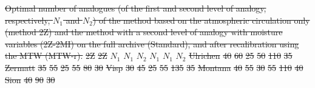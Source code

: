\documentclass[hess, manuscript]{copernicus}
\providecommand{\DIFdel}[1]{{\protect\color{red}\sout{#1}}}                      %
\providecommand{\DIFdelFL}[1]{\DIFdel{#1}} %
\begin{document}
\begin{table}[htb]
{%
\DIFdelFL{Optimal number of analogues (of the first and second level of analogy, respectively, $N_{1}$ and $N_{2}$) of the method based on the atmospheric circulation only (method 2Z) and the method with a second level of analogy with moisture variables (2Z-2MI) on the full archive (Standard), and after recalibration using the MTW (MTW-r).}}
\DIFdelFL{2Z }%
\DIFdelFL{2Z }%
\DIFdelFL{$N_{1}$ }%
\DIFdelFL{$N_{1}$ }%
\DIFdelFL{$N_{2}$ }%
\DIFdelFL{$N_{1}$ }%
\DIFdelFL{$N_{1}$ }%
\DIFdelFL{$N_{2}$}%
\DIFdelFL{Ulrichen }%
\DIFdelFL{40 }%
\DIFdelFL{60 }%
\DIFdelFL{25 }%
\DIFdelFL{50 }%
\DIFdelFL{110 }%
\DIFdelFL{35}%
\DIFdelFL{Zermatt }%
\DIFdelFL{35 }%
\DIFdelFL{55 }%
\DIFdelFL{25 }%
\DIFdelFL{55 }%
\DIFdelFL{80 }%
\DIFdelFL{30}%
\DIFdelFL{Visp }%
\DIFdelFL{30 }%
\DIFdelFL{45 }%
\DIFdelFL{25 }%
\DIFdelFL{55 }%
\DIFdelFL{135 }%
\DIFdelFL{35}%
\DIFdelFL{Montana }%
\DIFdelFL{40 }%
\DIFdelFL{55 }%
\DIFdelFL{30 }%
\DIFdelFL{55 }%
\DIFdelFL{110 }%
\DIFdelFL{40}%
\DIFdelFL{Sion }%
\DIFdelFL{40 }%
\DIFdelFL{90 }%
\DIFdelFL{30 }%

\end{table}
\end{document}
